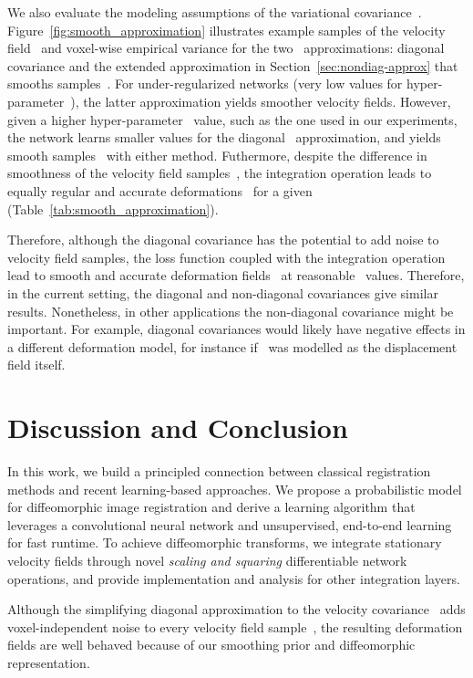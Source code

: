 \documentclass{article}
\begin{document}
	
	We also evaluate the modeling assumptions of the variational covariance~. Figure~\ref{fig:smooth_approximation} illustrates example samples of the velocity field~ and voxel-wise empirical variance for the two~ approximations: diagonal covariance and the extended approximation in Section~\ref{sec:nondiag-approx} that smooths samples~. For under-regularized networks (very low values for hyper-parameter~), the latter approximation yields smoother velocity fields. However, given a higher hyper-parameter~ value, such as the one used in our experiments, the network learns smaller values for the diagonal~ approximation, and yields smooth samples~ with either method. Futhermore, despite the difference in smoothness of the velocity field samples~, the integration operation leads to equally regular and accurate deformations~ for a given~ (Table~\ref{tab:smooth_approximation}). 
	
	Therefore, although the diagonal covariance has the potential to add noise to velocity field samples, the loss function coupled with the integration operation lead to smooth and accurate deformation fields~ at reasonable~ values.  {\color{blue}Therefore, in the current setting, the diagonal and non-diagonal covariances give similar results.
	Nonetheless, in other applications the non-diagonal covariance might be important. For example,
	diagonal covariances would likely have negative effects in a different deformation model, for instance if~ was modelled as the displacement field itself.}



 
\vspace{0.2cm}
\section{Discussion and Conclusion}


In this work, we build a principled connection between classical registration methods and recent learning-based approaches. We propose a probabilistic model for diffeomorphic image registration and derive a learning algorithm that leverages a convolutional neural network and unsupervised, end-to-end learning for fast runtime. To achieve diffeomorphic transforms, we integrate stationary velocity fields through novel \textit{scaling and squaring} differentiable network operations, and provide implementation and analysis for other integration layers. 

Although the simplifying diagonal approximation to the velocity covariance~ adds voxel-independent noise to every velocity field sample~, the resulting deformation fields are well behaved because of our smoothing prior and diffeomorphic representation.
\end{document}

